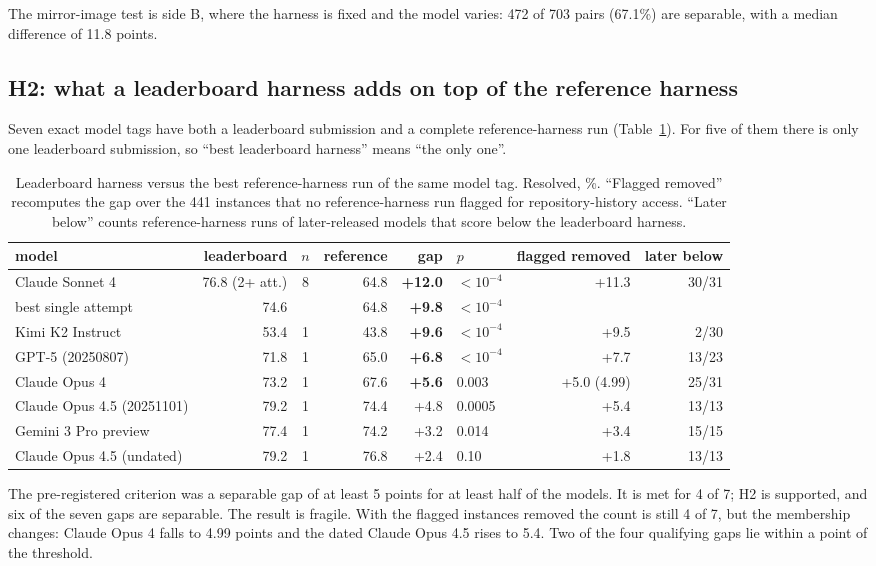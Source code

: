 \documentclass[10pt]{article}
\begin{document}
The mirror-image test is side B, where the harness is fixed and the model varies: 472 of 703 pairs (67.1\%) are separable, with a median difference of 11.8 points.

\subsection{H2: what a leaderboard harness adds on top of the reference harness}

Seven exact model tags have both a leaderboard submission and a complete reference-harness run (Table~\ref{tab:h2}). For five of them there is only one leaderboard submission, so ``best leaderboard harness'' means ``the only one''.

\begin{table}[t]
\centering
\small\setlength{\tabcolsep}{4pt}
\caption{Leaderboard harness versus the best reference-harness run of the same model tag. Resolved, \%. ``Flagged removed'' recomputes the gap over the 441 instances that no reference-harness run flagged for repository-history access. ``Later below'' counts reference-harness runs of later-released models that score below the leaderboard harness.}
\label{tab:h2}
\begin{tabular}{lrcrrlrr}
\toprule
model & leaderboard & $n$ & reference & gap & $p$ & flagged removed & later below \\
\midrule
Claude Sonnet 4 & 76.8 (2+ att.) & 8 & 64.8 & \textbf{+12.0} & $<10^{-4}$ & +11.3 & 30/31 \\
\quad best single attempt & 74.6 & & 64.8 & \textbf{+9.8} & $<10^{-4}$ & & \\
Kimi K2 Instruct & 53.4 & 1 & 43.8 & \textbf{+9.6} & $<10^{-4}$ & +9.5 & 2/30 \\
GPT-5 (20250807) & 71.8 & 1 & 65.0 & \textbf{+6.8} & $<10^{-4}$ & +7.7 & 13/23 \\
Claude Opus 4 & 73.2 & 1 & 67.6 & \textbf{+5.6} & 0.003 & +5.0 (4.99) & 25/31 \\
Claude Opus 4.5 (20251101) & 79.2 & 1 & 74.4 & +4.8 & 0.0005 & +5.4 & 13/13 \\
Gemini 3 Pro preview & 77.4 & 1 & 74.2 & +3.2 & 0.014 & +3.4 & 15/15 \\
Claude Opus 4.5 (undated) & 79.2 & 1 & 76.8 & +2.4 & 0.10 & +1.8 & 13/13 \\
\bottomrule
\end{tabular}
\end{table}

The pre-registered criterion was a separable gap of at least 5 points for at least half of the models. It is met for 4 of 7; H2 is supported, and six of the seven gaps are separable. The result is fragile. With the flagged instances removed the count is still 4 of 7, but the membership changes: Claude Opus 4 falls to 4.99 points and the dated Claude Opus 4.5 rises to 5.4. Two of the four qualifying gaps lie within a point of the threshold.
\end{document}
